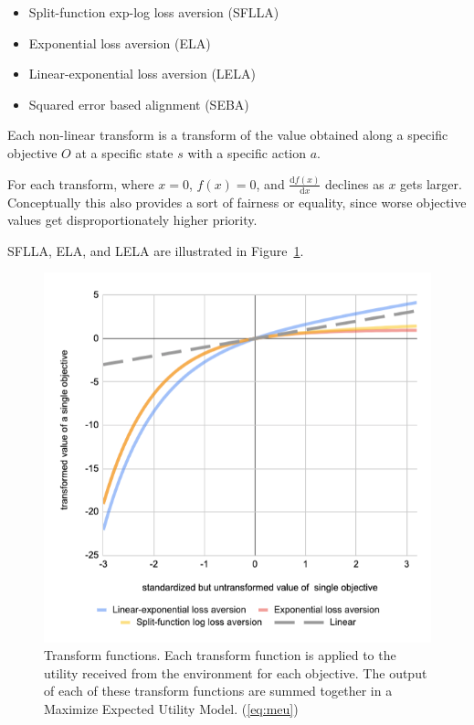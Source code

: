 \begin{itemize}
    \item Split-function exp-log loss aversion (SFLLA)
    \item Exponential loss aversion (ELA)
    \item Linear-exponential loss aversion (LELA)
    \item Squared error based alignment (SEBA)
\end{itemize}

Each non-linear transform is a transform of the value obtained along a specific objective $O$ at a specific state $s$ with a specific action $a$.

For each transform, where $x=0$, $f(x)=0$, and $\frac{\mathrm{d} f(x) }{\mathrm{d} x}$ declines as $x$ gets larger. Conceptually this also provides a sort of fairness or equality, since worse objective values get disproportionately higher priority.

SFLLA, ELA, and LELA are illustrated in Figure~\ref{fig:transform_functions}.

\begin{figure}[h]
 
  \includegraphics[width=\columnwidth]{output/transform_graph_2d.png}
  \caption{Transform functions. Each transform function is applied to the utility received from the environment for each objective. The output of each of these transform functions are summed together in a Maximize Expected Utility Model. (\ref{eq:meu})}
  \label{fig:transform_functions}
\end{figure}

